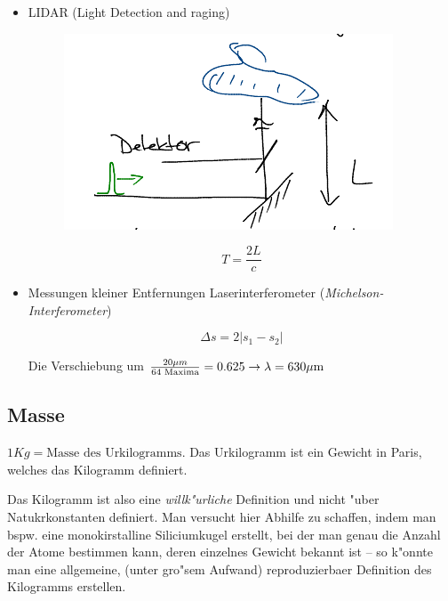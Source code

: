 \begin{Beispiel}
\begin{itemize}
\item LIDAR (Light Detection and raging)\\
 \begin{figure}[!h]
  \includegraphics[scale=0.5]{bilder/fig10}
 \end{figure}
 \[
 T=\frac{2L}{c}
 \]
 
\item Messungen kleiner Entfernungen Laserinterferometer (\emph{Michelson-Interferometer})


 \[
  \Delta s= 2 |s_1-s_2|
 \]

 Die Verschiebung um $\frac{20 \mu m}{\text{64 Maxima}}=0.625 \to \lambda=630\mu \text{m } $
\end{itemize}
\end{Beispiel}




\subsection{Masse}

\begin{Def}\label{def_kilogramm}
   $1Kg = \text{Masse des Urkilogramms}$. Das Urkilogramm ist ein
   Gewicht in Paris, welches das Kilogramm definiert.
\end{Def}

Das Kilogramm ist also eine \emph{willk"urliche} {Definition} und nicht
"uber Natukrkonstanten definiert. Man versucht hier Abhilfe zu
schaffen, indem man bspw. eine monokirstalline Siliciumkugel erstellt,
bei der man genau die Anzahl der Atome bestimmen kann, deren einzelnes
Gewicht bekannt ist -- so k"onnte man eine allgemeine, (unter gro"sem
Aufwand) reproduzierbaer Definition des Kilogramms erstellen.







